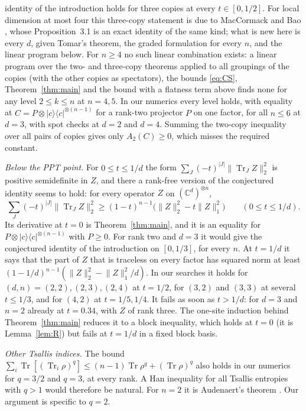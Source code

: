 \documentclass[11pt]{article}
\theoremstyle{remark}
\newcommand{\Tr}{\operatorname{Tr}}
\newcommand{\norm}[1]{\lVert #1\rVert}
\begin{document}
identity of the introduction holds for three copies at every $t\in[0,1/2]$. For local dimension at most four this three-copy statement is due to MacCormack and Bao \cite[Thm.~1.2]{MB}, whose Proposition~3.1 is an exact identity of the same kind; what is new here is every $d$, given Tomar's theorem, the graded formulation for every $n$, and the linear program below. For $n\ge4$ no such linear combination
exists: a linear program over the two- and three-copy theorems applied to all groupings of the copies (with the other
copies as spectators), the bounds \eqref{eq:CS}, Theorem~\ref{thm:main} and the bound with a flatness term above finds
none for any level $2\le k\le n$ at $n=4,5$. In our numerics every level holds, with equality at
$C=P\otimes|c\rangle\langle c|^{\otimes(n-1)}$ for a rank-two projector $P$ on one factor, for all $n\le6$ at $d=3$,
with spot checks at $d=2$ and $d=4$. Summing the two-copy inequality over all pairs of copies gives only
$A_2(C)\ge0$, which misses the required constant.

\emph{Below the PPT point.} For $0\le t\le1/d$ the form $\sum_J(-t)^{|J|}\norm{\Tr_JZ}_2^2$ is positive semidefinite in
$Z$, and there a rank-free version of the conjectured identity seems to hold: for every operator $Z$ on
$(\mathbb C^d)^{\otimes n}$,
\[
\sum_J(-t)^{|J|}\norm{\Tr_JZ}_2^2\ge(1-t)^{n-1}\big(\norm{Z}_2^2-t\norm{Z}_1^2\big)\qquad(0\le t\le1/d).
\]
Its derivative at $t=0$ is Theorem~\ref{thm:main}, and it is an equality for $P\otimes|c\rangle\langle c|^{\otimes(n-1)}$
with $P\ge0$. For rank two and $d=3$ it would give the conjectured identity of the introduction on $[0,1/3]$, for every
$n$. At $t=1/d$ it says that the part of $Z$ that is traceless on every factor has squared norm at least
$(1-1/d)^{n-1}(\norm{Z}_2^2-\norm{Z}_1^2/d)$. In our searches it holds for $(d,n)=(2,2),(2,3),(2,4)$ at $t=1/2$, for
$(3,2)$ and $(3,3)$ at several $t\le1/3$, and for $(4,2)$ at $t=1/5,1/4$. It fails as soon as $t>1/d$: for $d=3$ and
$n=2$ already at $t=0.34$, with $Z$ of rank three. The one-site induction behind Theorem~\ref{thm:main} reduces it to a
block inequality, which holds at $t=0$ (it is Lemma~\ref{lem:R}) but fails at $t=1/d$ in a fixed block basis.

\emph{Other Tsallis indices.} The bound $\sum_i\Tr[(\Tr_i\rho)^q]\le(n-1)\Tr\rho^q+(\Tr\rho)^q$ also holds in our
numerics for $q=3/2$ and $q=3$, at every rank. A Han inequality for all Tsallis entropies with $q>1$ would therefore be
natural. For $n=2$ it is Audenaert's theorem \cite{Aud}. Our argument is specific to $q=2$.
\end{document}

